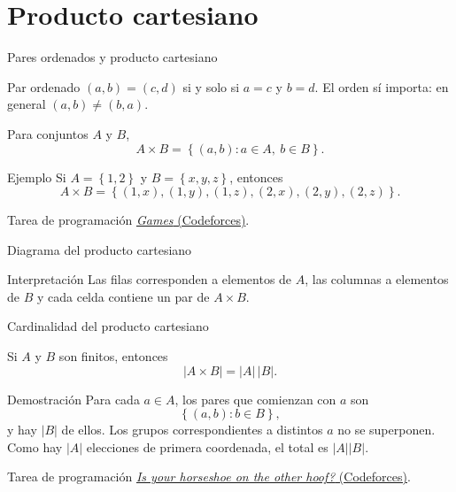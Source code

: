 \documentclass[aspectratio=169,11pt]{beamer}
\newcommand{\card}[1]{\lvert #1\rvert}
\newcommand{\Set}[1]{\left\{#1\right\}}
\begin{document}
\section{Producto cartesiano}
\begin{frame}{Pares ordenados y producto cartesiano}
    \begin{block}{Par ordenado}
        $(a,b)=(c,d)$ si y solo si $a=c$ y $b=d$. El orden sí importa: en general $(a,b)\ne(b,a)$.
    \end{block}
    \begin{definition}
        Para conjuntos $A$ y $B$,
        \[
          A\times B=\Set{(a,b):a\in A,\ b\in B}.
        \]
    \end{definition}
    \begin{exampleblock}{Ejemplo}
        Si $A=\Set{1,2}$ y $B=\Set{x,y,z}$, entonces
        \[
          A\times B=\Set{(1,x),(1,y),(1,z),(2,x),(2,y),(2,z)}.
        \]
    \end{exampleblock}
    \begin{exampleblock}{Tarea de programación}
        \href{https://codeforces.com/problemset/problem/268/A}{\textit{Games} (Codeforces)}.
    \end{exampleblock}
\end{frame}

\begin{frame}{Diagrama del producto cartesiano}
    \centering
    
    \begin{exampleblock}{Interpretación}
        Las filas corresponden a elementos de $A$, las columnas a elementos de $B$ y cada celda contiene un par de $A\times B$.
    \end{exampleblock}
\end{frame}

\begin{frame}{Cardinalidad del producto cartesiano}
    \begin{theorem}
        Si $A$ y $B$ son finitos, entonces
        \[
          \card{A\times B}=\card{A}\,\card{B}.
        \]
    \end{theorem}
    \begin{block}{Demostración}
        Para cada $a\in A$, los pares que comienzan con $a$ son
        \[
          \Set{(a,b):b\in B},
        \]
        y hay $\card{B}$ de ellos. Los grupos correspondientes a distintos $a$ no se superponen. Como hay $\card{A}$ elecciones de primera coordenada, el total es $\card{A}\card{B}$.
    \end{block}
    \begin{exampleblock}{Tarea de programación}
        \href{https://codeforces.com/problemset/problem/228/A}{\textit{Is your horseshoe on the other hoof?} (Codeforces)}.
    \end{exampleblock}
\end{frame}
\end{document}
